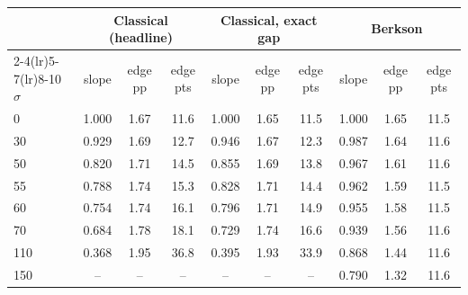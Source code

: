 \begin{tabular}{lccccccccc}
\toprule
 & \multicolumn{3}{c}{Classical (headline)} & \multicolumn{3}{c}{Classical, exact gap} & \multicolumn{3}{c}{Berkson} \\
\cmidrule(lr){2-4}\cmidrule(lr){5-7}\cmidrule(lr){8-10}
$\sigma$ & slope & edge pp & edge pts & slope & edge pp & edge pts & slope & edge pp & edge pts \\
\midrule
0 & 1.000 & 1.67 & 11.6 & 1.000 & 1.65 & 11.5 & 1.000 & 1.65 & 11.5 \\
30 & 0.929 & 1.69 & 12.7 & 0.946 & 1.67 & 12.3 & 0.987 & 1.64 & 11.6 \\
50 & 0.820 & 1.71 & 14.5 & 0.855 & 1.69 & 13.8 & 0.967 & 1.61 & 11.6 \\
55 & 0.788 & 1.74 & 15.3 & 0.828 & 1.71 & 14.4 & 0.962 & 1.59 & 11.5 \\
60 & 0.754 & 1.74 & 16.1 & 0.796 & 1.71 & 14.9 & 0.955 & 1.58 & 11.5 \\
70 & 0.684 & 1.78 & 18.1 & 0.729 & 1.74 & 16.6 & 0.939 & 1.56 & 11.6 \\
110 & 0.368 & 1.95 & 36.8 & 0.395 & 1.93 & 33.9 & 0.868 & 1.44 & 11.6 \\
150 & -- & -- & -- & -- & -- & -- & 0.790 & 1.32 & 11.6 \\
\bottomrule
\end{tabular}
